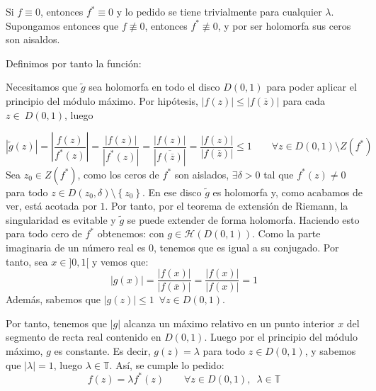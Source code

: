 \documentclass[12pt]{article}
\begin{document}
\begin{ejercicio}[2.5 puntos]
\begin{enumerate}[label=\alph*)]
            Si \(f \equiv 0\), entonces \(f^\ast \equiv 0\) y lo pedido se tiene trivialmente para cualquier \(\lambda\). Supongamos entonces que \(f \not \equiv 0\), entonces \(f^\ast \not \equiv 0\), y por ser holomorfa sus ceros son aisaldos.

            Definimos por tanto la función:

            Necesitamos que \(\tilde{g}\) sea holomorfa en todo el disco \(D(0,1)\) para poder aplicar el principio del módulo máximo. Por hipótesis, \(|f(z)| \leq |f(\overline{z})|\) para cada \(z \in~D(0,1)\), luego

            \[
                \left|\tilde{g}(z)\right| = \left|\frac{f(z)}{f^\ast(z)}\right| = \frac{\left|f(z)\right|}{\left|f^\ast(z)\right|} = \frac{\left|f(z)\right|}{\left|\overline{f(\overline{z})}\right|} = \frac{\left|f(z)\right|}{\left|f(\overline{z})\right|} \leq 1 \qquad \forall z \in D(0,1) \setminus Z(f^\ast)
            \]
            Sea \(z_0 \in Z(f^\ast)\), como los ceros de \(f^\ast\) son aislados, \(\exists \delta >0\) tal que \(f^\ast(z) \neq 0\) para todo \(z \in D(z_0,\delta) \setminus \left\{z_0\right\}\). En ese disco \(\tilde{g}\) es holomorfa y, como acabamos de ver, está acotada por \(1\). Por tanto, por el teorema de extensión de Riemann, la singularidad es evitable y \(\tilde{g}\) se puede extender de forma holomorfa. Haciendo esto para todo cero de \(f^\ast\) obtenemos:
            con \(g \in \mathcal{H}(D(0,1))\).
            Como la parte imaginaria de un número real es \(0\), tenemos que es igual a su conjugado. Por tanto, sea 
            \(x \in ]0,1[\) y vemos que:
            \[
                \left|g(x)\right| = \frac{\left|f(x)\right|}{\left|f(\overline{x})\right|} = \frac{\left|f(x)\right|}{\left|f(x)\right|} = 1
            \]
            Además, sabemos que \(|g(z)| \leq 1 \enspace \forall z \in D(0,1) \).


            Por tanto, tenemos que \(|g|\) alcanza un máximo relativo en un punto interior \(x\) del segmento de recta real contenido en \(D(0,1)\). Luego por el principio del módulo máximo, \(g\) es constante. Es decir, \(g(z) = \lambda\) para todo \(z \in D(0,1)\), y sabemos que \(|\lambda| = 1\), luego \(\lambda \in \mathbb{T}\). Así, se cumple lo pedido:
            \[
                f(z) = \lambda f^\ast(z) \qquad \forall z \in D(0,1), \enspace \lambda \in \mathbb{T}
            \]
        \end{enumerate}
    \end{ejercicio}
\end{document}
